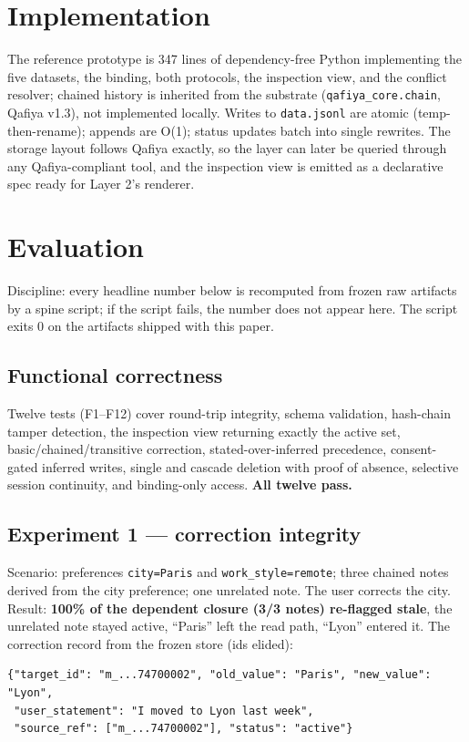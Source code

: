 \documentclass[11pt]{article}
\begin{document}
\section{Implementation}
The reference prototype is 347 lines of dependency-free Python implementing the five datasets, the binding, both protocols, the inspection view, and the conflict resolver; chained history is inherited from the substrate (\texttt{qafiya\_core.chain}, Qafiya v1.3), not implemented locally. Writes to \texttt{data.jsonl} are atomic (temp-then-rename); appends are O(1); status updates batch into single rewrites. The storage layout follows Qafiya exactly, so the layer can later be queried through any Qafiya-compliant tool, and the inspection view is emitted as a declarative spec ready for Layer 2's renderer.

\section{Evaluation}
\label{sec:eval}
Discipline: every headline number below is recomputed from frozen raw artifacts by a spine script; if the script fails, the number does not appear here. The script exits 0 on the artifacts shipped with this paper.

\subsection{Functional correctness}
Twelve tests (F1--F12) cover round-trip integrity, schema validation, hash-chain tamper detection, the inspection view returning exactly the active set, basic/chained/transitive correction, stated-over-inferred precedence, consent-gated inferred writes, single and cascade deletion with proof of absence, selective session continuity, and binding-only access. \textbf{All twelve pass.}

\subsection{Experiment 1 --- correction integrity}
Scenario: preferences \texttt{city=Paris} and \texttt{work\_style=remote}; three chained notes derived from the city preference; one unrelated note. The user corrects the city. Result: \textbf{100\% of the dependent closure (3/3 notes) re-flagged stale}, the unrelated note stayed active, ``Paris'' left the read path, ``Lyon'' entered it. The correction record from the frozen store (ids elided):

\begin{lstlisting}
{"target_id": "m_...74700002", "old_value": "Paris", "new_value": "Lyon",
 "user_statement": "I moved to Lyon last week",
 "source_ref": ["m_...74700002"], "status": "active"}
\end{lstlisting}
\end{document}
